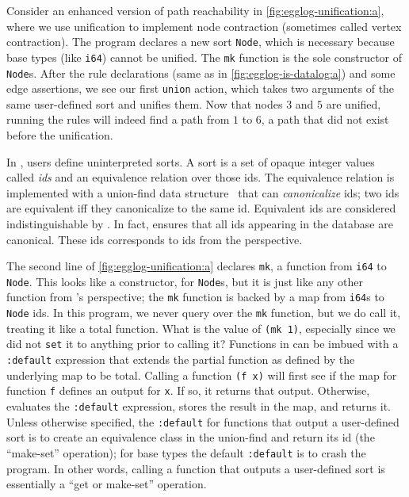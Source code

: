 Consider an enhanced version of path reachability 
 in \autoref{fig:egglog-unification:a},
 where we use unification to implement node contraction
 (sometimes called vertex contraction).
The program declares a new sort \lstinline{Node},
 which is necessary because base types (like \lstinline{i64})
 cannot be unified.
The \lstinline{mk} function is the sole constructor of \lstinline{Node}s.
After the rule declarations (same as in \autoref{fig:egglog-is-datalog:a})
 and some edge assertions,
 we see our first \lstinline{union} action,
 which takes two arguments
 of the same user-defined sort and unifies them.
Now that nodes $3$ and $5$ are unified,
 running the rules will indeed find a path from $1$ to $6$, 
 a path that did not exist before the unification.

In \egglog, users define uninterpreted sorts.
A sort is a set of opaque integer values
 called \emph{ids} and an equivalence relation over those ids.
The equivalence relation is implemented
 with a union-find data structure~\cite{unionfind}
 that can \emph{canonicalize} ids;
 two ids are equivalent iff 
 they canonicalize to the same id.
Equivalent ids are considered indistinguishable by \egglog.
In fact,
 \egglog ensures that all ids appearing in the database are canonical.
These ids corresponds to \eclass ids from the \eqsat perspective.

The second line of \autoref{fig:egglog-unification:a}
 declares \lstinline{mk}, 
 a function from \lstinline{i64} to \lstinline{Node}.
This looks like a constructor, for \lstinline{Node}s, 
 but it is just like any other function from \egglog's perspective;
 the \lstinline{mk} function is backed 
 by a map from \lstinline{i64}s to \lstinline{Node} ids.
In this program,
 we never query over the \lstinline{mk} function,
 but we do call it, treating it like a total function.
What is the value of \lstinline{(mk 1)},
 especially since we did not \lstinline{set} it to anything
 prior to calling it?
Functions in \egglog can be imbued with a 
 \lstinline{:default} expression that extends
 the partial function as defined by the underlying map to be total.
Calling a function \lstinline{(f x)} will first see if
 the map for function \lstinline{f} defines 
 an output for \lstinline{x}.
If so, it returns that output.
Otherwise, 
 \egglog evaluates the \lstinline{:default} expression,
 stores the result in the map,
 and returns it.
Unless otherwise specified,
 the \lstinline{:default} for functions that output a
 user-defined sort is to create an equivalence class in the union-find
 and return its id
 (the ``make-set'' operation);
 for base types the default \lstinline{:default} 
 is to crash the program.
In other words,
 calling a function that outputs a user-defined sort
 is essentially a ``get or make-set'' operation.

